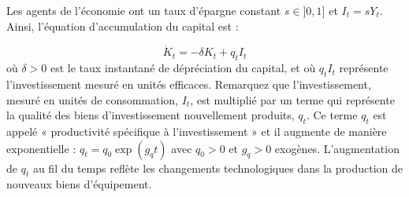 \documentclass{article}
\begin{document}


Les agents de l’économie ont un taux d’épargne constant \( s \in]0,1] \) et $I_t = s Y_t $.  Ainsi, l’équation d’accumulation du capital est :

\begin{equation}\label{eq1}
    \dot{K}_t = -\delta K_t + q_t I_t 
\end{equation}
où \( \delta > 0 \) est le taux instantané de dépréciation du capital, et où $q_t I_t$ représente l'investissement mesuré en unités efficaces. Remarquez que l'investissement, mesuré en unités de consommation, $I_t$, est multiplié par un terme qui représente la qualité des biens d'investissement nouvellement produits, $q_t$. Ce terme $q_t$ est appelé « productivité spécifique à l’investissement » et il augmente de manière exponentielle : $q_t = q_0 \exp(g_q t)$ avec $q_0 > 0$ et $g_q > 0$ exogènes. L'augmentation de $q_t$ au fil du temps reflète les changements technologiques dans la production de nouveaux biens d'équipement.



\end{document}
